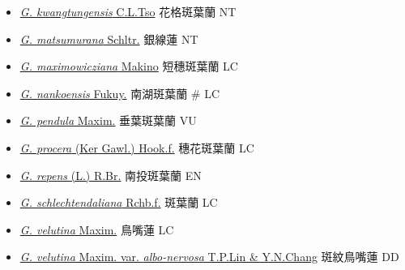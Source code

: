 \begin{itemize}
\begin{itemize}
        \item[] \href{http://www.theplantlist.org/tpl1.1/search?q=Goodyera+kwangtungensis}{\textit{G. kwangtungensis} C.L.Tso}   花格斑葉蘭   NT
        \item[] \href{http://www.theplantlist.org/tpl1.1/search?q=Goodyera+matsumurana}{\textit{G. matsumurana} Schltr.}   銀線蓮   NT
        \item[] \href{http://www.theplantlist.org/tpl1.1/search?q=Goodyera+maximowicziana}{\textit{G. maximowicziana} Makino}   短穗斑葉蘭   LC
        \item[] \href{http://www.theplantlist.org/tpl1.1/search?q=Goodyera+nankoensis}{\textit{G. nankoensis} Fukuy.}   南湖斑葉蘭  \# LC
        \item[] \href{http://www.theplantlist.org/tpl1.1/search?q=Goodyera+pendula}{\textit{G. pendula} Maxim.}   垂葉斑葉蘭   VU
        \item[] \href{http://www.theplantlist.org/tpl1.1/search?q=Goodyera+procera}{\textit{G. procera} (Ker Gawl.) Hook.f.}   穗花斑葉蘭   LC
        \item[] \href{http://www.theplantlist.org/tpl1.1/search?q=Goodyera+repens}{\textit{G. repens} (L.) R.Br.}   南投斑葉蘭   EN
        \item[] \href{http://www.theplantlist.org/tpl1.1/search?q=Goodyera+schlechtendaliana}{\textit{G. schlechtendaliana} Rchb.f.}   斑葉蘭   LC
        \item[] \href{http://www.theplantlist.org/tpl1.1/search?q=Goodyera+velutina}{\textit{G. velutina} Maxim.}   鳥嘴蓮   LC
        \item[] \href{http://www.theplantlist.org/tpl1.1/search?q=Goodyera+velutina+var.+albo-nervosa}{\textit{G. velutina} Maxim. var. \textit{albo-nervosa} T.P.Lin \& Y.N.Chang}   斑紋鳥嘴蓮   DD

\end{itemize}
\end{itemize}
